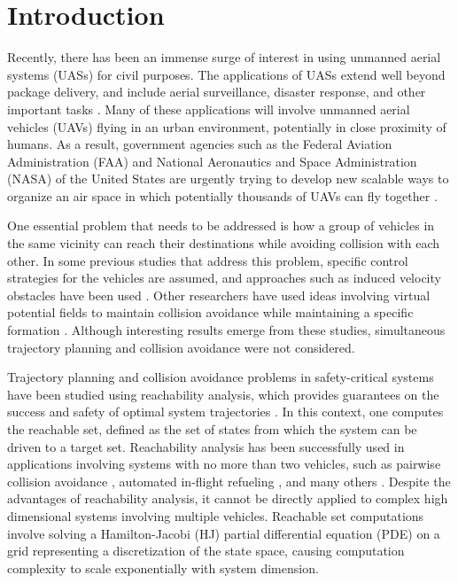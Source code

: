 \section{Introduction}
Recently, there has been an immense surge of interest in using unmanned aerial systems (UASs) for civil purposes. The applications of UASs extend well beyond package delivery, and include aerial surveillance, disaster response, and other important tasks \cite{Tice91, Debusk10, Amazon16, AUVSI16, BBC16}. Many of these applications will involve unmanned aerial vehicles (UAVs) flying in an urban environment, potentially in close proximity of humans. As a result, government agencies such as the Federal Aviation Administration (FAA) and National Aeronautics and Space Administration (NASA) of the United States are urgently trying to develop new scalable ways to organize an air space in which potentially thousands of UAVs can fly together \cite{FAA13, NASA16,Kopardekar16}.

One essential problem that needs to be addressed is how a group of vehicles in the same vicinity can reach their destinations while avoiding collision with each other. In some previous studies that address this problem, specific control strategies for the vehicles are assumed, and approaches such as induced velocity obstacles have been used \cite{Fiorini98, Chasparis05, Vandenberg08}. Other researchers have used ideas involving virtual potential fields to maintain collision avoidance while maintaining a specific formation \cite{Saber02, Chuang07}. Although interesting results emerge from these studies, simultaneous trajectory planning and collision avoidance were not considered. 

Trajectory planning and collision avoidance problems in safety-critical systems have been studied using reachability analysis, which provides guarantees on the success and safety of optimal system trajectories \cite{Barron90, Mitchell05, Bokanowski10, Bokanowski11, Margellos11, Fisac15}. In this context, one computes the reachable set, defined as the set of states from which the system can be driven to a target set. Reachability analysis has been successfully used in applications involving systems with no more than two vehicles, such as pairwise collision avoidance \cite{Mitchell05}, automated in-flight refueling \cite{Ding08}, and many others \cite{Huang11, Bayen07}. Despite the advantages of reachability analysis, it cannot be directly applied to complex high dimensional systems involving multiple vehicles. Reachable set computations involve solving a Hamilton-Jacobi (HJ) partial differential equation (PDE) on a grid representing a discretization of the state space, causing computation complexity to scale exponentially with system dimension. 

